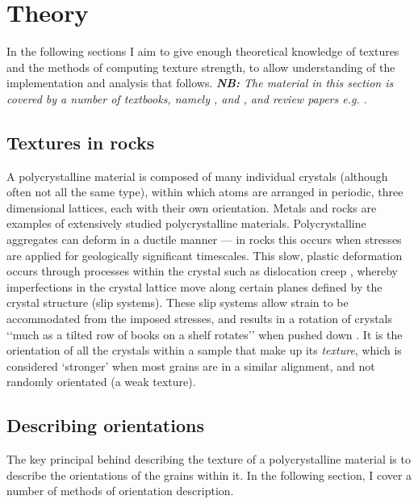 \documentclass[a4paper,12pt,twoside]{report}
\numberwithin{equation}{chapter}
\begin{document}
\chapter{Theory} \label{chap:theory}
\vspace{-1cm}
In the following sections I aim to give enough theoretical knowledge of textures and the methods of computing texture strength, to allow understanding of the implementation and analysis that follows. \emph{\textbf{NB:} The material in this section is covered by a number of textbooks, namely \cite{bunge1982texture}, \cite{Bunge1985} and \cite{Randle2000}, and review papers e.g. \cite{Mainprice}}.


\section{Textures in rocks} 
A polycrystalline material is composed of many individual crystals (although often not all the same type), within which atoms are arranged in periodic, three dimensional lattices, each with their own orientation. Metals and rocks are examples of extensively studied polycrystalline materials. Polycrystalline aggregates can deform in a ductile manner --- in rocks this occurs when stresses are applied for geologically significant timescales. This slow, plastic deformation occurs through processes within the crystal such as dislocation creep \citep{Ashby1972},  whereby imperfections in the crystal lattice move along certain planes defined by the crystal structure (slip systems). These slip systems allow strain to be accommodated from the imposed stresses, and results in a rotation of crystals \lq\lq{}much as a tilted row of books on a shelf rotates\rq\rq{} when pushed down \citep{Goulding2015}. It is the orientation of all the crystals within a sample that make up its \emph{texture}, which is considered \lq{}stronger\rq{} when most grains are in a similar alignment, and not randomly orientated (a weak texture).       


\section{Describing orientations} \label{sec:orientations}
The key principal behind describing the texture of a polycrystalline material is to describe the orientations of the grains within it. In the following section, I cover a number of methods of orientation description.
\end{document}
